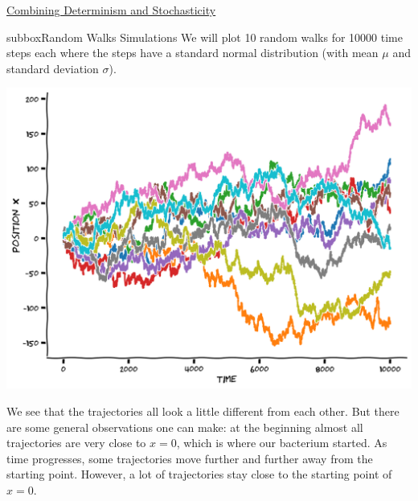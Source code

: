 \begin{textbox}{\href{https://compneuro.neuromatch.io/tutorials/W2D2_LinearSystems/student/W2D2_Tutorial3.html}{Combining Determinism and Stochasticity } }

\begin{subbox}{subbox}{Random Walks Simulations}
\scriptsize
We will plot 10 random walks for 10000 time steps each where the steps have a standard normal distribution (with mean $\mu$ and standard deviation $\sigma$). 


\begin{center}
\includegraphics[scale=0.25]{Figures/LS/CDS_Figure3.png}
\end{center}

We see that the trajectories all look a little different from each other. But there are some general observations one can make: at the beginning almost all trajectories are very close to $x=0$, which is where our bacterium started. As time progresses, some trajectories move further and further away from the starting point. However, a lot of trajectories stay close to the starting point of $x=0$. 


\end{subbox}
\end{textbox}
